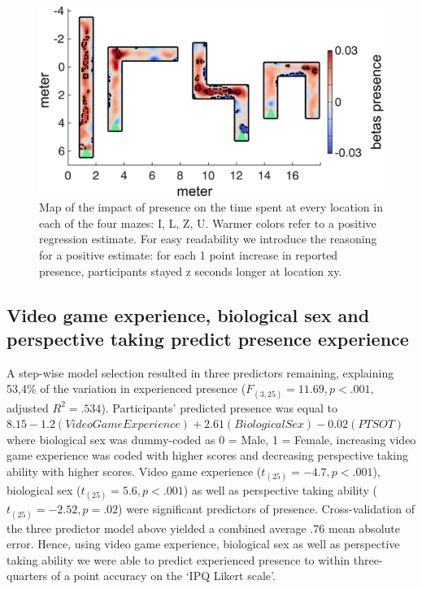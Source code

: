 \begin{figure}[!t]
\centering
\includegraphics[width=\linewidth]{figures/head_loc_reg.pdf}
\caption{Map of the impact of presence on the time spent at every location in each of the four mazes: I, L, Z, U. Warmer colors refer to a positive regression estimate. For easy readability we introduce the reasoning for a positive estimate: for each 1 point increase in reported presence, participants stayed z seconds longer at location xy.}
\label{presence_head_loc}
\end{figure}

\subsection{Video game experience, biological sex and perspective taking predict presence experience} A step-wise model selection resulted in three predictors remaining, explaining 53,4\% of the variation in experienced presence ($F_{(3,25)}=11.69, p < .001,$ adjusted $R^2=.534$). Participants' predicted presence was equal to $8.15 - 1.2 (Video Game Experience) + 2.61 (Biological Sex) - 0.02 (PTSOT)$ where biological sex was dummy-coded as 0 = Male, 1 = Female, increasing video game experience was coded with higher scores and decreasing perspective taking ability with higher scores. Video game experience ($t_{(25)}=-4.7, p<.001$), biological  sex ($t_{(25)}=5.6, p<.001$) as well as perspective taking ability ($t_{(25)}=-2.52, p=.02$) were significant predictors of presence. Cross-validation of the three predictor model above yielded a combined average .76 mean absolute error. Hence, using video game experience, biological  sex as well as perspective taking ability we were able to predict experienced presence to within three-quarters of a point accuracy on the `IPQ Likert scale'.


